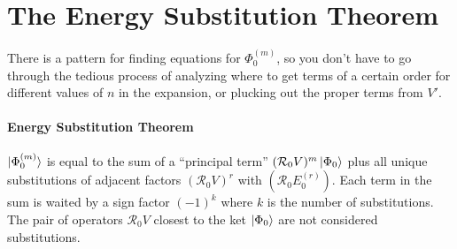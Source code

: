 \documentclass{article}
\newcommand{\Rz}{\mathcal{R}_{0}}
\begin{document}

\section{The Energy Substitution Theorem}
There is a pattern for finding equations for $\Phi_0^{(m)}$, so you don't have to
go through the tedious process of analyzing where to get terms of a certain order for different
values of $n$ in the expansion, or plucking out the proper terms from $V'$.

\paragraph{\textbf{Energy Substitution Theorem}}
 $\ket{\Phi_0^{(m)}}$ is equal to the sum of a ``principal term'' 
 $(\Rz V)^m \ket{\Phi_0} $ plus all unique substitutions of 
adjacent factors $(\Rz V)^r$ with $(\Rz E_0^{(r)})$. Each term
in the sum is waited by a sign factor $(-1)^k$ where $k$ is the number of substitutions.
The pair of operators $\Rz V$ closest to the ket $\ket{\Phi_0}$ are not considered substitutions. \\
\end{document}
